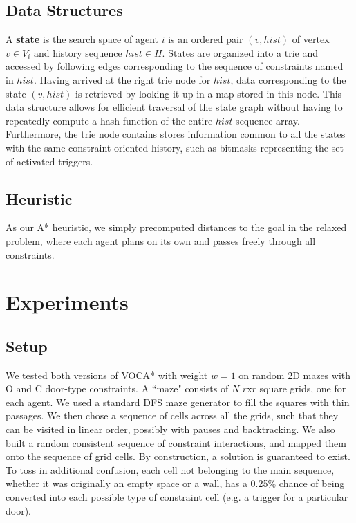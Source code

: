 \documentclass[letterpaper]{article}
\begin{document}
\subsection{Data Structures}
A \textbf{state} is the search space of agent $i$ is an ordered pair $(v, hist)$ of vertex $v\in V_i$ and history sequence $hist\in H$. States are organized into a trie and accessed by following edges corresponding to the sequence of constraints named in $hist$. Having arrived at the right trie node for $hist$, data corresponding to the state $(v, hist)$ is retrieved by looking it up in a map stored in this node. This data structure allows for efficient traversal of the state graph without having to repeatedly compute a hash function of the entire $hist$ sequence array. Furthermore, the trie node contains stores information common to all the states with the same constraint-oriented history, such as bitmasks representing the set of activated triggers.

\subsection{Heuristic}
As our A* heuristic, we simply precomputed distances to the goal in the relaxed problem, where each agent plans on its own and passes freely through all constraints.

\section{Experiments}

\subsection{Setup}
We tested both versions of VOCA* with weight $w = 1$ on random 2D mazes with O and C door-type constraints. A ``maze" consists of $N$ $r$x$r$ square grids, one for each agent. We used a standard DFS maze generator to fill the squares with thin passages. We then chose a sequence of cells across all the grids, such that they can be visited in linear order, possibly with pauses and backtracking. We also built a random consistent sequence of constraint interactions, and mapped them onto the sequence of grid cells. By construction, a solution is guaranteed to exist. To toss in additional confusion, each cell not belonging to the main sequence, whether it was originally an empty space or a wall, has a 0.25\% chance of being converted into each possible type of constraint cell (e.g. a trigger for a particular door).
\end{document}
